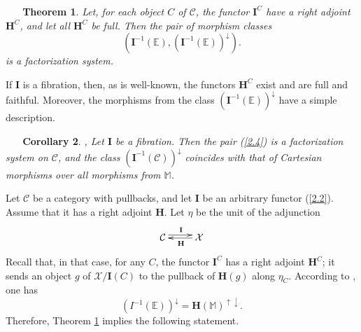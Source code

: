 \documentclass[12pt,reqno,intlim]{amsart}
\numberwithin{equation}{section}
\newtheorem{theo}{\ \ \ Theorem}[section]
\newtheorem{cor}[theo]{\ \ \ Corollary}
\theoremstyle{definition}
\theoremstyle{remark}
\begin{document}
\begin{theo} \cite[Theorem 3.4]{Z3} \label{theo2.1}
Let, for each object
$C$ of $\mathcal{C}$, the functor $\mathbf{I}^C$
have a right adjoint $\mathbf{H}^C$, and let all $\mathbf{H}^C$ be full. Then the pair of morphism classes 
\begin{equation} \label{2.4}
(\mathbf{I}^{-1}(\mathbb{E}), (\mathbf{I}^{-1}(\mathbb{E}))^{\downarrow}).
\end{equation}
 is a factorization system.

\end{theo}


If $\mathbf{I}$ is a fibration, then, as is well-known, the functors $\mathbf{H}^C$ exist and are full and faithful. Moreover, the morphisms from the class $(\mathbf{I}^{-1}(\mathbb{E}))^{\downarrow}$ have a simple description. 

\begin{cor} \cite[Example 1.3(2)]{PT}, \cite[Remark 3.10]{Z3} \label{theo2.2}
Let $\mathbf{I}$ be a fibration. Then the pair (\ref{2.4}) is a factorization system on $\mathcal{C}$, and the class $(\mathbf{I}^{-1}(\mathcal{C}))^{\downarrow}$ coincides with that of Cartesian morphisms over all morphisms from $\mathbb{M}$.
\end{cor}




Let $\mathcal{C}$ be a category with pullbacks, and let $\mathbf{I}$ be an arbitrary functor (\ref{2.2}). Assume that it has a right adjoint $\mathbf{H}$. Let $\eta$ be the unit of the adjunction
\begin{equation} \label{2.5}
\xymatrix{\mathcal{C}\ar@<0.7ex>[r]^{\mathbf{I}}&\mathcal{X}\ar[l]^{\mathbf{H}}}
\end{equation}
 Recall that, in that case, for any $C$, the functor $\mathbf{I}^{C}$ has a right adjoint $\mathbf{H}^C$; it sends an object $g$ of $\mathcal{X}/\mathbf{I}(C)$ to the pullback of $\mathbf{H}(g)$ along $\eta_C$. According to \cite[Lemma 2.2]{Z1}, one has  
 \begin{equation} \label{2.6}
 (I^{-1}(\mathbb{E}))^{\downarrow}=\mathbf{H}(\mathbb{M})^{\uparrow\downarrow}.
 \end{equation}  
 Therefore, Theorem \ref{theo2.1} implies the following statement.
\end{document}
